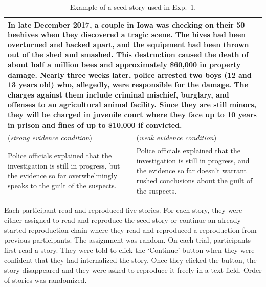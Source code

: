 \documentclass[10pt,letterpaper]{article}
\newcommand{\mf}[1]{\textcolor{PinkyPurple}{[mf: #1]}}
\begin{document}
\begin{table}
\caption{Example of a seed story used in Exp.~1.}
\centering
\begin{tabular}{p{} p{}}
  \toprule
  \multicolumn{2}{p{0.925\textwidth}}{In late December 2017, a couple in Iowa was checking on their 50 beehives when they discovered a tragic scene. The hives had been overturned and hacked apart, and the equipment had been thrown out of the shed and smashed. This destruction caused the death of about half a million bees and approximately \$60,000 in property damage. Nearly three weeks later, police arrested two boys (12 and 13 years old) who, allegedly, were responsible for the damage. The charges against them include criminal mischief, burglary, and offenses to an agricultural animal facility. Since they are still minors, they will be charged in juvenile court where they face up to 10 years in prison and fines of up to \$10,000 if convicted.}\\ 
  \midrule
  (\emph{strong evidence condition}) & (\emph{weak evidence condition})  \\
  Police officials explained that the investigation is still in progress, but the evidence so far overwhelmingly speaks to the guilt of the suspects.  & Police officials explained that the investigation is still in progress, and the evidence so far doesn't warrant rushed conclusions about the guilt of the suspects. \\ 
  \bottomrule
\end{tabular}
\label{tab:examplestory}
\end{table}

Each participant read and reproduced five stories. For each story, they were either assigned to read and reproduce the seed story or continue an already started reproduction chain where they read and reproduced a reproduction from previous participants. The assignment was random.
 On each trial, participants first read a story. They were told to click the `Continue' button when they were confident that they had internalized the story. Once they clicked the button, the story disappeared and they were asked to reproduce it freely in a text field. Order of stories was randomized.
 
\end{document}
